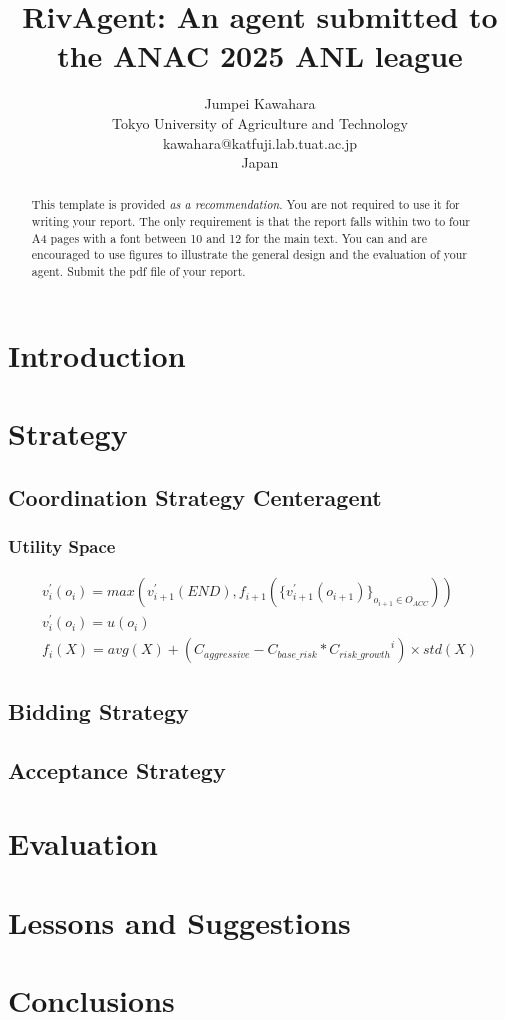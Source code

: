 \documentclass{article}
\title{RivAgent: An agent submitted to the ANAC 2025 ANL league}
\author{Jumpei Kawahara\\Tokyo University of Agriculture and Technology\\kawahara@katfuji.lab.tuat.ac.jp\\Japan}
\begin{document}
\maketitle
\begin{abstract}
	This template is provided \emph{as a recommendation}. You are not required
	to use it for writing your report. The only requirement is that the report
	falls within two to four A4 pages with a font between 10 and 12 for the main
	text. You can and are encouraged to use figures to illustrate the general
	design and the evaluation of your agent. Submit the pdf file of your report.
\end{abstract}
\section{Introduction}
\section{Strategy}
\subsection{Coordination Strategy Centeragent}
\subsubsection{Utility Space}
\begin{eqnarray}
	{v}^{\prime}_i(o_i) = max(v^{\prime}_{i+1}(END), f_{i+1}(\{v^{\prime}_{i+1}(o_{i+1})\}_{o_{i+1}\in O_{ACC}}))\\
	{v}^{\prime}_i(o_i) = u(o_i)\\
	f_i(X) = avg(X) + (C_{aggressive} - C_{base\_risk} * {C_{risk\_growth}}^i) \times std(X)
\end{eqnarray}
\subsection{Bidding Strategy}
\subsection{Acceptance Strategy}
\section{Evaluation}
\section{Lessons and Suggestions}
\section*{Conclusions}
\end{document}
